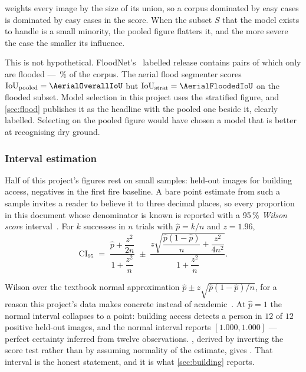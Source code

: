  weights every image by the size of its union, so a corpus
dominated by easy cases is dominated by easy cases in the score. When the
subset $S$ that the model exists to handle is a small minority, the pooled
figure flatters it, and the more severe the case the smaller its influence.

This is not hypothetical. FloodNet's~\citep{rahnemoonfar2021floodnet} labelled
release contains \AerialLabelled{} pairs of which only \AerialFlooded{} are
flooded — \AerialFloodedShare\,\% of the corpus. The aerial flood segmenter
scores $\iou_{\text{pooled}} = \AerialOverallIoU$ but
$\iou_{\text{strat}} = \AerialFloodedIoU$ on the flooded subset. Model
selection in this project uses the stratified figure, and \cref{sec:flood}
publishes it as the headline with the pooled one beside it, clearly labelled.
Selecting on the pooled figure would have chosen a model that is better at
recognising dry ground.

\subsubsection{Interval estimation}
\label{sec:intervals}

Half of this project's figures rest on small samples: \BuildingTestImages{}
held-out images for building access, \FireNarrowNegatives{} negatives in the
first fire baseline. A bare point estimate from such a sample invites a reader
to believe it to three decimal places, so every proportion in this document
whose denominator is known is reported with a 95\,\% \emph{Wilson score}
interval~\citep{wilson1927probable}. For $k$ successes in $n$ trials with
$\hat{p} = k/n$ and $z = 1.96$,
\begin{equation}
  \mathrm{CI}_{95} \;=\;
  \frac{\hat{p} + \dfrac{z^{2}}{2n}}{1 + \dfrac{z^{2}}{n}}
  \;\pm\;
  \frac{z\sqrt{\dfrac{\hat{p}(1-\hat{p})}{n} + \dfrac{z^{2}}{4n^{2}}}}
       {1 + \dfrac{z^{2}}{n}}.
  \label{eq:wilson}
\end{equation}

Wilson over the textbook normal approximation
$\hat{p} \pm z\sqrt{\hat{p}(1-\hat{p})/n}$, for a reason this project's data
makes concrete instead of academic~\citep{brown2001interval}. At
$\hat{p} = 1$ the normal interval collapses to a point: building access
detects a person in $12$ of $12$ positive held-out images, and the normal
interval reports $[1.000, 1.000]$ — perfect certainty inferred from twelve
observations. , derived by inverting the score test rather
than by assuming normality of the estimate, gives
\BuildingImageRecallCI. That interval is the honest statement, and it is what
\cref{sec:building} reports.

